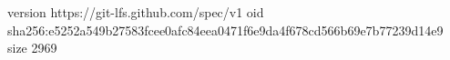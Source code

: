 version https://git-lfs.github.com/spec/v1
oid sha256:e5252a549b27583fcee0afc84eea0471f6e9da4f678cd566b69e7b77239d14e9
size 2969
